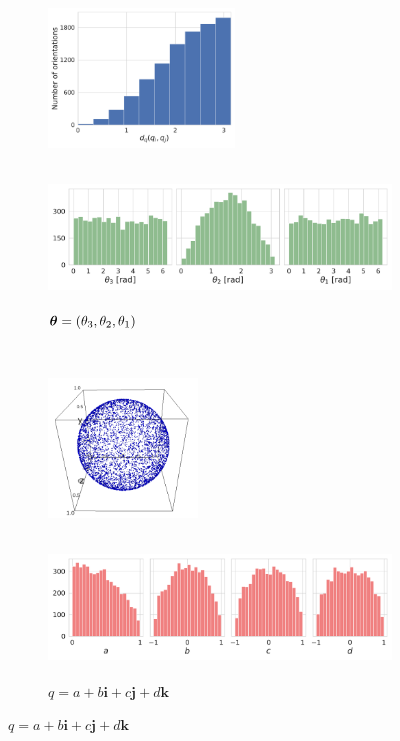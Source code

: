 \begin{figure}[ht!]
    \centering
    \begin{subfigure}[b]{0.26\linewidth}
        \centering
        \includegraphics[height=10em]{figures/dQ_5j0n_uniform_quaternions.pdf}
        \caption{}%
    \end{subfigure}
    \hfill
    \begin{subfigure}[b]{0.66\linewidth}
        \centering
        \includegraphics[height=10em]{figures/uniform_quaternions_ang.pdf}
        \caption{${\boldsymbol{\theta}} = (\theta_3,\theta_2,\theta_1)$}%
    \end{subfigure}
    
    \\ \vspace{1em}
    
    \begin{subfigure}[b]{0.26\linewidth}
        \centering
        \includegraphics[height=10em]{figures/uniform_quaternion.png}
        \caption{}%
    \end{subfigure}
    \hfill
    \begin{subfigure}[b]{0.66\linewidth}
        \centering
        \includegraphics[height=10em]{figures/uniform_quaternions_q.pdf}
        \caption{$q = a + b\boldsymbol{i} + c\boldsymbol{j} + d\boldsymbol{k}$}%
    \end{subfigure}
    

\end{figure}
